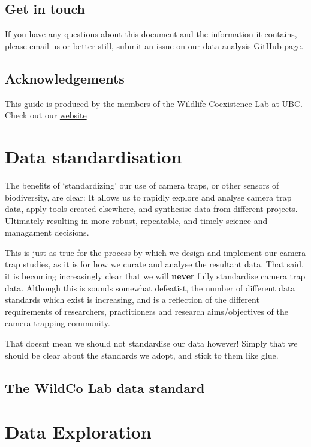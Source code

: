 \documentclass[]{book}
\begin{document}
\section{Get in touch}\label{get-in-touch}

If you have any questions about this document and the information it
contains, please \href{wildco.lab@gmail.com}{email us} or better still,
submit an issue on our
\href{https://github.com/WildCoLab/WildCo_Data_Analysis}{data analysis
GitHub page}.

\section{Acknowledgements}\label{acknowledgements}

This guide is produced by the members of the Wildlife Coexistence Lab at
UBC. Check out our \href{}{website}

\chapter{Data standardisation}\label{data-standardisation}

The benefits of `standardizing' our use of camera traps, or other
sensors of biodiversity, are clear: It allows us to rapidly explore and
analyse camera trap data, apply tools created elsewhere, and synthesise
data from different projects. Ultimately resulting in more robust,
repeatable, and timely science and managament decisions.

This is just as true for the process by which we design and implement
our camera trap studies, as it is for how we curate and analyse the
resultant data. That said, it is becoming increasingly clear that we
will \textbf{never} fully standardise camera trap data. Although this is
sounds somewhat defeatist, the number of different data standards which
exist is increasing, and is a reflection of the different requirements
of researchers, practitioners and research aims/objectives of the camera
trapping community.

That doesnt mean we should not standardise our data however! Simply that
we should be clear about the standards we adopt, and stick to them like
glue.

\section{The WildCo Lab data
standard}\label{the-wildco-lab-data-standard}

\chapter{Data Exploration}\label{data-exploration}
\end{document}
